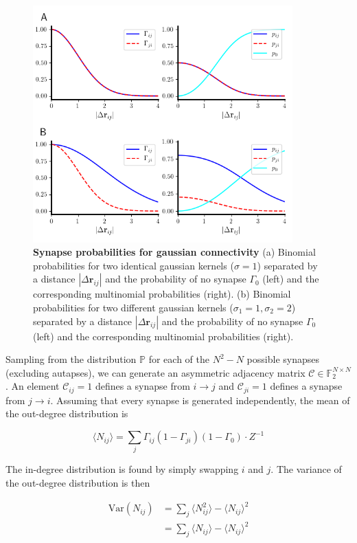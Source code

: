 \documentclass{ucetd}
\begin{document}
\begin{figure}[t!]
\centering
\includegraphics[width=100mm]{figure-7}
\caption{\textbf{Synapse probabilities for gaussian connectivity} (a) Binomial probabilities for two identical gaussian kernels ($\sigma=1$) separated by a distance $|\Delta\mathbf{r}_{ij}|$ and the probability of no synapse $\Gamma_{0}$ (left) and the corresponding multinomial probabilities (right). (b) Binomial probabilities for two different gaussian kernels ($\sigma_{1}=1, \sigma_{2}=2$) separated by a distance $|\Delta\mathbf{r}_{ij}|$ and the probability of no synapse $\Gamma_{0}$ (left) and the corresponding multinomial probabilities (right). }
\end{figure}

Sampling from the distribution $\mathbb{P}$ for each of the $N^{2} - N$ possible synapses (excluding autapses), we can generate an asymmetric adjacency matrix $\mathcal{C} \in \mathbb{F}_{2}^{N\times N}$. An element $\mathcal{C}_{ij} = 1$ defines a synapse from $i\rightarrow j$ and $\mathcal{C}_{ji} = 1$ defines a synapse from $j\rightarrow i$. Assuming that every synapse is generated independently, the mean of the out-degree distribution is

\begin{equation}
\langle N_{ij} \rangle = \sum_{j} \Gamma_{ij}(1-\Gamma_{ji})(1-\Gamma_{0})\cdot Z^{-1}
\end{equation}

The in-degree distribution is found by simply swapping $i$ and $j$. The variance of the out-degree distribution is then

\begin{align}
\mathrm{Var}(N_{ij}) &= \sum_{j} \langle N_{ij}^{2} \rangle - \langle N_{ij} \rangle ^{2} \\
&= \sum_{j} \langle N_{ij}\rangle - \langle N_{ij} \rangle ^{2} 
\end{align}
\end{document}
